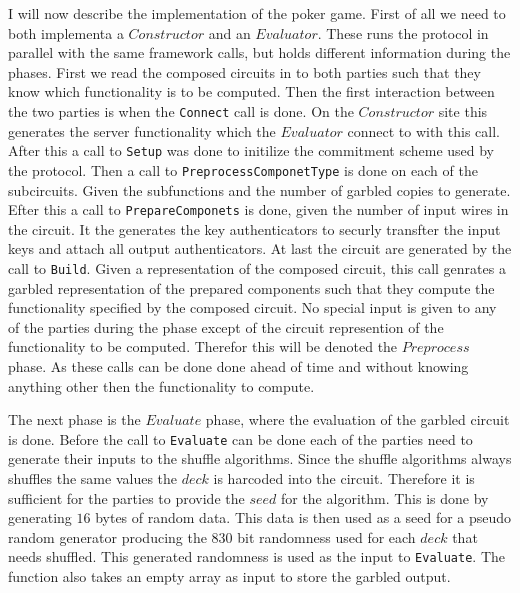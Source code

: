 \documentclass[twoside,11pt,openright]{report}
\begin{document}
\bigskip

I will now describe the implementation of the poker game. First of all we need to both implementa a $Constructor$ and an $Evaluator$. These runs the protocol in parallel with the same framework calls, but holds different information during the phases. First we read the composed circuits in to both parties such that they know which functionality is to be computed. 
Then the first interaction between the two parties is when the \verb|Connect| call is done. On the $Constructor$ site this generates the server functionality which the $Evaluator$ connect to with this call. 
After this a call to \verb|Setup| was done to initilize the commitment scheme used by the protocol.
Then a call to \verb|PreprocessComponetType| is done on each of the subcircuits. Given the subfunctions and the number of garbled copies to generate.
Efter this a call to \verb|PrepareComponets| is done, given the number of input wires in the circuit. It the generates the key authenticators to securly transfter the input keys and attach all output authenticators.
At last the circuit are generated by the call to \verb|Build|. Given a representation of the composed circuit, this call genrates a garbled representation of the prepared components such that they compute the functionality specified by the composed circuit.
No special input is given to any of the parties during the phase except of the circuit represention of the functionality to be computed. Therefor this will be denoted the $Preprocess$ phase. As these calls can be done done ahead of time and without knowing anything other then the functionality to compute.

The next phase is the $Evaluate$ phase, where the evaluation of the garbled circuit is done. Before the call to \verb|Evaluate| can be done each of the parties need to generate their inputs to the shuffle algorithms. Since the shuffle algorithms always shuffles the same values the $deck$ is harcoded into the circuit. Therefore it is sufficient for the parties to provide the $seed$ for the algorithm. This is done by generating $16$ bytes of random data. This data is then used as a seed for a pseudo random generator producing the $830$ bit randomness used for each $deck$ that needs shuffled. This generated randomness is used as the input to \verb|Evaluate|. The function also takes an empty array as input to store the garbled output.
\end{document}
